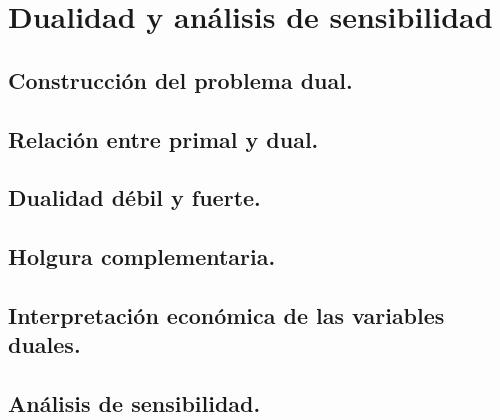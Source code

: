 \section{Dualidad y análisis de sensibilidad}

\subsection{Construcción del problema dual.}
\subsection{Relación entre primal y dual.}
\subsection{Dualidad débil y fuerte.}
\subsection{Holgura complementaria.}
\subsection{Interpretación económica de las variables duales.}
\subsection{Análisis de sensibilidad.}
